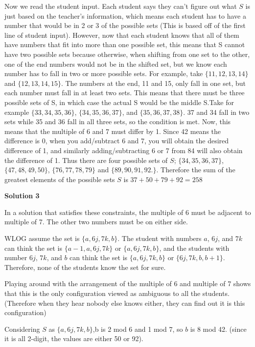 \begin{enumerate}
 Now we read the student input. Each student says they can’t figure out what $S$ is just based on the teacher’s information, which means each student has to have a number that would be in 2 or 3 of the possible sets (This is based off of the first line of student input). However, now that each student knows that all of them have numbers that fit into more than one possible set, this means that S cannot have two possible sets because otherwise, when shifting from one set to the other, one of the end numbers would not be in the shifted set, but we know each number has to fall in two or more possible sets. For example, take $\{11,12,13,14\}$ and $\{12,13,14,15\}$. The numbers at the end, 11 and 15, only fall in one set, but each number must fall in at least two sets. This means that there must be three possible sets of S, in which case the actual S would be the middle S.Take for example $\{33,34,35,36\}$, $\{34,35,36,37\}$, and $\{35,36,37,38\}$. 37 and 34 fall in two sets while 35 and 36 fall in all three sets, so the condition is met. Now, this means that the multiple of 6 and 7 must differ by 1. Since 42 means the difference is 0, when you add/subtract 6 and 7, you will obtain the desired difference of 1, and similarly adding/subtracting 6 or 7 from 84 will also obtain the difference of 1. Thus there are four possible sets of $S$; $\{34,35,36,37\}$, $\{47,48,49,50\}$, $\{76,77,78,79\}$ and $\{89,90,91,92.\}$. Therefore the sum of the greatest elements of the possible sets $S$ is $37+50+79+92=\boxed{258}$




\textbf{Solution 3}

In a solution that satisfies these constraints, the multiple of 6 must be adjacent to multiple of 7. The other two numbers must be on either side. 

 WLOG assume the set is $\{a,6j,7k,b\}$. The student with numbers $a$, $6j$, and $7k$ can think the set is $\{a-1, a,6j,7k\}$ or $\{a,6j,7k,b\}$, and the students with number $6j$, $7k$, and $b$ can think the set is $\{a,6j,7k,b\}$ or $\{6j,7k,b, b+1\}$. Therefore, none of the students know the set for sure. 

 Playing around with the arrangement of the multiple of 6 and multiple of 7 shows that this is the only configuration viewed as ambiguous to all the students. (Therefore when they hear nobody else knows either, they can find out it is this configuration)

 Considering $S$ as $\{a,6j,7k,b\}$,b is 2 mod 6 and 1 mod 7, so $b$ is 8 mod 42. (since it is all 2-digit, the values are either 50 or 92).


\end{enumerate}
